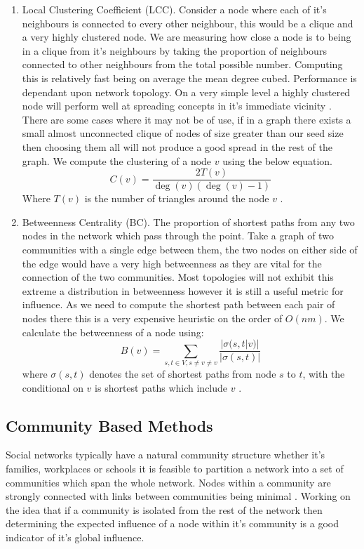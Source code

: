 \documentclass{article}
\begin{document}
\begin{enumerate}
	\item Local Clustering Coefficient (LCC). Consider a node where each of it's neighbours is connected to every other neighbour, this would be a clique and a very highly clustered node. We are measuring how close a node is to being in a clique from it's neighbours by taking the proportion of neighbours connected to other neighbours from the total possible number.
	      Computing this is relatively fast being on average the mean degree cubed. Performance is dependant upon network topology. On a very simple level a highly clustered node will perform well at spreading concepts in it's immediate vicinity \cite{franks2014learning}. There are some cases where it may not be of use, if in a graph there exists a small almost unconnected clique of nodes of size greater than our seed size then choosing them all will not produce a good spread in the rest of the graph.
	      We compute the clustering of a node $v$ using the below equation.
	      \begin{equation}
		      C(v) = \frac{2 T(v)}{\deg(v)(\deg(v) - 1)}
	      \end{equation}
	      Where $T(v)$ is the number of triangles around the node $v$ \cite{clustering_coef}.
	\item Betweenness Centrality (BC). The proportion of shortest paths from any two nodes in the network which pass through the point. Take a graph of two communities with a single edge between them, the two nodes on either side of the edge would have a very high betweenness as they are vital for the connection of the two communities. Most topologies will not exhibit this extreme a distribution in betweenness however it is still a useful metric for influence. As we need to compute the shortest path between each pair of nodes there this is a very expensive heuristic on the order of $O(nm)$.
	      We calculate the betweenness of a node using:
	      \begin{equation}
		      B(v) = \sum_{s, t \in V, s \neq v \neq v} \frac{|\sigma(s, t | v)|}{|\sigma(s, t)|}
	      \end{equation} where $\sigma(s,t)$ denotes the set of shortest paths from node $s$ to $t$, with the conditional on $v$ is shortest paths which include $v$ \cite{betweenness}.
\end{enumerate}

\subsection{Community Based Methods}
Social networks typically have a natural community structure whether it's families, workplaces or schools it is feasible to partition a network into a set of communities which span the whole network.
Nodes within a community are strongly connected with links between communities being minimal \cite{cim}.
Working on the idea that if a community is isolated from the rest of the network then determining the expected influence of a node within it's community is a good indicator of it's global influence.
\end{document}
